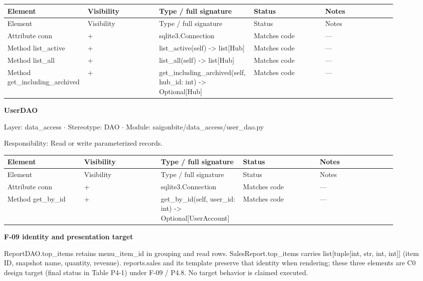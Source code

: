 \begin{longtable}{>{\raggedright\arraybackslash}p{0.1840\linewidth}>{\raggedright\arraybackslash}p{0.1840\linewidth}>{\raggedright\arraybackslash}p{0.1840\linewidth}>{\raggedright\arraybackslash}p{0.1840\linewidth}>{\raggedright\arraybackslash}p{0.1840\linewidth}}
Element & Visibility & Type / full signature & Status & Notes \\
\hline\endfirsthead
Element & Visibility & Type / full signature & Status & Notes \\
\hline\endhead
Attribute conn & + & sqlite3.Connection & Matches code & --- \\
Method list\_active & + & list\_active(self) -\textgreater{} list[Hub] & Matches code & --- \\
Method list\_all & + & list\_all(self) -\textgreater{} list[Hub] & Matches code & --- \\
Method get\_including\_archived & + & get\_including\_archived(self, hub\_id: int) -\textgreater{} Optional[Hub] & Matches code & --- \\
\end{longtable}
\textbf{UserDAO}

Layer: data\_access \ensuremath{\cdot} Stereotype: \guillemotleft{}DAO\guillemotright{} \ensuremath{\cdot} Module: saigonbite/data\_access/user\_dao.py

Responsibility: Read or write parameterized records.

\begin{longtable}{>{\raggedright\arraybackslash}p{0.1840\linewidth}>{\raggedright\arraybackslash}p{0.1840\linewidth}>{\raggedright\arraybackslash}p{0.1840\linewidth}>{\raggedright\arraybackslash}p{0.1840\linewidth}>{\raggedright\arraybackslash}p{0.1840\linewidth}}
Element & Visibility & Type / full signature & Status & Notes \\
\hline\endfirsthead
Element & Visibility & Type / full signature & Status & Notes \\
\hline\endhead
Attribute conn & + & sqlite3.Connection & Matches code & --- \\
Method get\_by\_id & + & get\_by\_id(self, user\_id: int) -\textgreater{} Optional[UserAccount] & Matches code & --- \\
\end{longtable}
\textbf{F-09 identity and presentation target}

ReportDAO.top\_items retains menu\_item\_id in grouping and read rows. SalesReport.top\_items carries list[tuple[int, str, int, int]] (item ID, snapshot name, quantity, revenue). reports.sales and its template preserve that identity when rendering; these three elements are C0 design target (final status in Table P4-1) under F-09 / P4.8. No target behavior is claimed executed.
